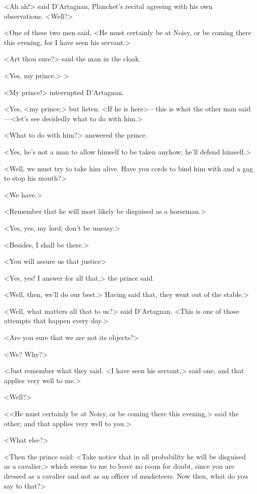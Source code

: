<Ah ah!> said D'Artagnan, Planchet's recital agreeing with his own observations. <Well?>

<One of these two men said, <He must certainly be at Noisy, or be coming there this evening, for I have seen his servant.>

	<Art thou sure?> said the man in the cloak.

	<Yes, my prince.>
>

<My prince!> interrupted D'Artagnan.

<Yes, <my prince;> but listen. 
	<If he is here>—this is what the other man said—<let's see decidedly what to do with him.>

	<What to do with him?> answered the prince.

	<Yes, he's not a man to allow himself to be taken anyhow; he'll defend himself.>

	<Well, we must try to take him alive. Have you cords to bind him with and a gag to stop his mouth?>

	<We have.>

	<Remember that he will most likely be disguised as a horseman.>

	<Yes, yes, my lord; don't be uneasy.>

	<Besides, I shall be there.>

	<You will assure us that justice\longdash>

	<Yes, yes! I answer for all that,> the prince said.

	<Well, then, we'll do our best.> Having said that, they went out of the stable.>

<Well, what matters all that to us?> said D'Artagnan. <This is one of those attempts that happen every day.>

<Are you sure that we are not its objects?>

<We? Why?>

<Just remember what they said. <I have seen his servant,> said one, and that applies very well to me.>

<Well?>

<<He must certainly be at Noisy, or be coming there this evening,> said the other; and that applies very well to you.>

<What else?>

<Then the prince said: <Take notice that in all probability he will be disguised as a cavalier;> which seems to me to leave no room for doubt, since you are dressed as a cavalier and not as an officer of musketeers. Now then, what do you say to that?>

